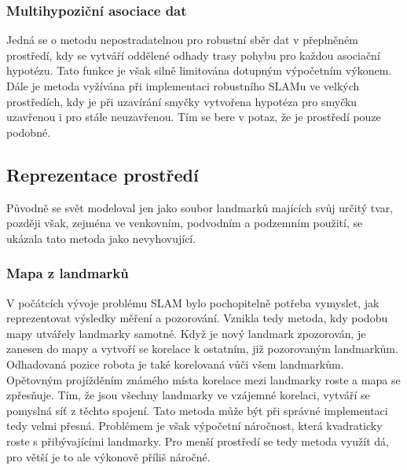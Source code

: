 \documentclass[12pt]{article}
\begin{document}
\subsubsection{Multihypoziční asociace dat}
Jedná se o metodu nepostradatelnou pro robustní sběr dat v přeplněném prostředí, kdy se vytváří oddělené odhady trasy pohybu pro každou asociační hypotézu. Tato funkce je však silně limitována dotupným výpočetním výkonem. Dále je metoda vyžívána při implementaci robustního SLAMu ve velkých prostředích, kdy je při uzavírání smyčky vytvořena hypotéza pro smyčku uzavřenou i pro stále neuzavřenou. Tím se bere v potaz, že je prostředí pouze podobné. 

\newpage
\subsection{Reprezentace prostředí}
Původně se svět modeloval jen jako soubor landmarků majících svůj určitý tvar, později však, zejména ve venkovním, podvodním a podzemním použití, se ukázala tato metoda jako nevyhovující.\\

\subsubsection{Mapa z landmarků}
V počátcích vývoje problému SLAM bylo pochopitelně potřeba vymyslet, jak reprezentovat výsledky měření a pozorování. Vznikla tedy metoda, kdy podobu mapy utvářely landmarky samotné. Když je nový landmark zpozorován, je zanesen do mapy a vytvoří se korelace k ostatním, již pozorovaným landmarkům. Odhadovaná pozice robota je také korelovaná vůči všem landmarkům. \\
\indent Opětovným projížděním známého místa korelace mezi landmarky roste a mapa se zpřesňuje. Tím, že jsou všechny landmarky ve vzájemné korelaci, vytváří se pomyslná síť z těchto spojení. Tato metoda může být při správné implementaci tedy velmi přesná. Problémem je však výpočetní náročnost, která kvadraticky roste s přibývajícími landmarky. Pro menší prostředí se tedy metoda využít dá, pro větší je to ale výkonově příliš náročné.
\end{document}
